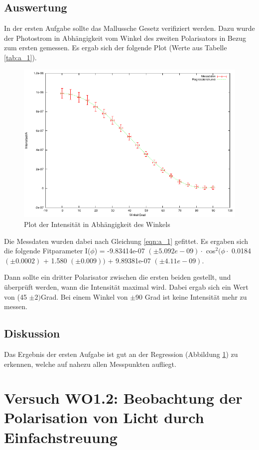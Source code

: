\documentclass[12pt]{scrartcl}
\begin{document}
\subsection{Auswertung}
In der ersten Aufgabe sollte das Mallussche Gesetz verifiziert werden. Dazu wurde der Photostrom in Abhängigkeit vom Winkel des zweiten Polarisators in Bezug zum ersten gemessen. Es ergab sich der folgende Plot (Werte aus Tabelle \ref{tab:a_1}).

\begin{figure}[H]
\centering
    \includegraphics[scale = 1]{a_1.pdf}
  	\caption[Plot der Intensität in Abhängigkeit des Winkels]{Plot der Intensität in Abhängigkeit des Winkels}
  \label{fig:a_1}
\end{figure}

Die Messdaten wurden dabei nach Gleichung \ref{eqn:a_1} gefittet. Es ergaben sich die folgende Fitparameter I($\phi$) = -9.83414e-07 $(\pm 5.092e-09) \cdot$ cos$^2(\phi \cdot$ 0.0184 $(\pm 0.0002)$ + 1.580 $(\pm 0.009) )$ + 9.89381e-07 $(\pm 4.11e-09)$.

Dann sollte ein dritter Polarisator zwischen die ersten beiden gestellt, und überprüft werden, wann die Intensität maximal wird. Dabei ergab sich ein Wert von (45 $\pm 2)$Grad. Bei einem Winkel von $\pm$90 Grad ist keine Intensität mehr zu messen.
\subsection{Diskussion}
Das Ergebnis der ersten Aufgabe ist gut an der Regression (Abbildung \ref{fig:a_1}) zu erkennen, welche auf nahezu allen Messpunkten aufliegt.


\section{Versuch WO1.2: Beobachtung der Polarisation von Licht durch Einfachstreuung}
\end{document}
